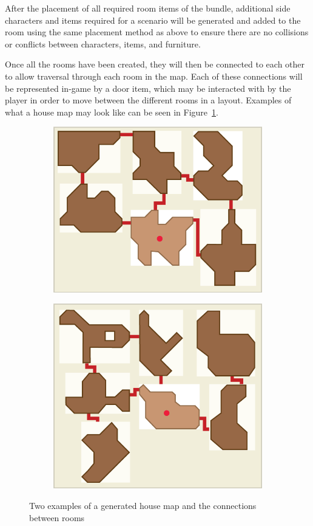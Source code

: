 After the placement of all required room items of the bundle, additional side characters and items required for a scenario will be generated and added to the room using the same placement method as above to ensure there are no collisions or conflicts between characters, items, and furniture.

Once all the rooms have been created, they will then be connected to each other to allow traversal through each room in the map. Each of these connections will be represented in-game by a door item, which may be interacted with by the player in order to move between the different rooms in a layout. Examples of what a house map may look like can be seen in  Figure~\ref{fig:house_map_example}.

\begin{figure}[htb]
	\centering %
	\begin{subfigure}{.45\textwidth}
		\centering
		\includegraphics[width=.9\linewidth]{images/RoomGeneration_HouseMapExample1}
	\end{subfigure}%
	\begin{subfigure}{.45\textwidth}
		\centering
		\includegraphics[width=.9\linewidth]{images/RoomGeneration_HouseMapExample2}
	\end{subfigure}
	 \caption{Two examples of a generated house map and the connections between rooms}
	 \label{fig:house_map_example}
\end{figure}

